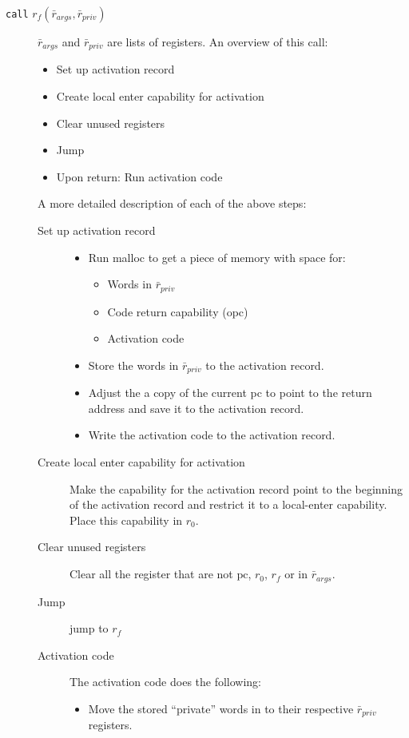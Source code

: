 \documentclass[a4paper]{article}
\newcommand{\var}[1]{\mathit{#1}}
\newcommand{\pcreg}{\mathrm{pc}}
\begin{document}
\begin{description}
\item[\texttt{call} $r_f(\bar{r}_{\var{args}},\bar{r}_{\var{priv}})$] $\bar{r}_{\var{args}}$ and $\bar{r}_{\var{priv}}$ are lists of registers. An overview of this call:
  \begin{itemize}
  \item Set up activation record
  \item Create local enter capability for activation
  \item Clear unused registers
  \item Jump
  \item Upon return: Run activation code
  \end{itemize}
A more detailed description of each of the above steps:
\begin{description}
  \item [Set up activation record]
    \begin{itemize}
    \item Run malloc to get a piece of memory with space for:
    \begin{itemize}
      \item Words in $\bar{r}_{\var{priv}}$
      \item Code return capability (opc)
      \item Activation code
    \end{itemize}
    \item Store the words in $\bar{r}_{\var{priv}}$ to the activation record. 
    \item Adjust the a copy of the current pc to point to the return address and save it to the activation record.
    \item Write the activation code to the activation record.
  \end{itemize}
  \item [Create local enter capability for activation] Make the capability for the activation record point to the beginning of the activation record and restrict it to a local-enter capability. Place this capability in $r_0$.
  \item [Clear unused registers]
    Clear all the register that are not $\pcreg$, $r_0$, $r_f$ or in $\bar{r}_{\var{args}}$.
  \item [Jump] jump to $r_f$
  \item [Activation code] The activation code does the following:
    \begin{itemize}
    \item Move the stored ``private'' words in to their respective $\bar{r}_{\var{priv}}$ registers.

\end{itemize}
\end{description}
\end{description}
\end{document}
